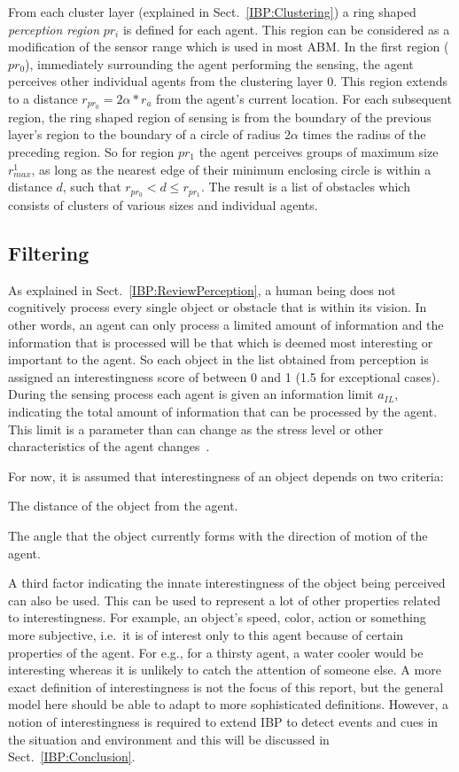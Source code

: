 From each cluster layer (explained in Sect.~\ref{IBP:Clustering}) a ring shaped {\em perception region} $pr_i$ is defined for each agent. This region can be considered as a modification of the sensor range which is used in most ABM.  In the first region ($pr_0$), immediately surrounding the agent performing the sensing, the agent perceives other individual agents from the clustering layer 0. This region extends to a distance $r_{pr_0} = 2\alpha *r_{a}$ from the agent's current location. For each subsequent region, the ring shaped region of sensing is from the boundary of the previous layer's region to the boundary of a circle of radius $2\alpha$ times the radius of the preceding region. So for region $pr_1$ the agent perceives groups of maximum size $r^{1}_{max}$, as long as the nearest edge of their minimum enclosing circle is within a distance $d$, such that $ r_{pr_0} < d \leq r_{pr_1}$. The result is a list of obstacles which consists of clusters of various sizes and individual agents.

\subsection{Filtering}
\label{IBP:Filtering}

As explained in Sect.~\ref{IBP:ReviewPerception}, a human being does not cognitively process every single object or obstacle that is within its vision. In other words, an agent can only process a limited amount of information and the information that is processed will be that which is deemed most interesting or important to the agent. So each object in the list obtained from perception is assigned an interestingness score of between 0 and 1 (1.5 for exceptional cases). During the sensing process each agent is given an information limit $a_{IL}$, indicating the total amount of information that can be processed by the agent. This limit is a parameter than can change as the stress level or other characteristics of the agent changes~\cite{Ozel:2001tn}.

For now, it is assumed that interestingness of an object depends on two criteria: 
\begin{inparaenum}
\item The distance of the object from the agent. 
\item The angle that the object currently forms with the direction of motion of the agent. 
\end{inparaenum}
A third factor indicating the innate interestingness of the object being perceived can also be used. This can be used to represent a lot of other properties related to interestingness. For example, an object's speed, color, action or something more subjective, i.e.\ it is of interest only to this agent because of certain properties of the agent. For e.g., for a thirsty agent, a water cooler would be interesting whereas it is unlikely to catch the attention of someone else. A more exact definition of interestingness is not the focus of this report, but the general model here should be able to adapt to more sophisticated definitions. However, a notion of interestingness is required to extend IBP to detect events and cues in the situation and environment and this will be discussed in Sect.~\ref{IBP:Conclusion}.


